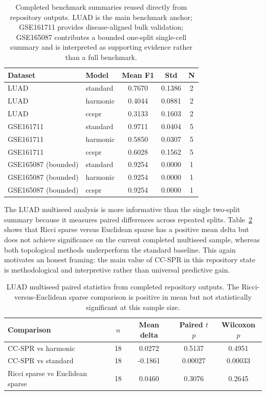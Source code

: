 \documentclass[11pt]{article}
\begin{document}
\begin{table}[h]
\centering
\small
\begin{tabular}{llccc}
\toprule
Dataset & Model & Mean F1 & Std & N \\
\midrule
LUAD & standard & 0.7670 & 0.1386 & 2 \\
LUAD & harmonic & 0.4044 & 0.0881 & 2 \\
LUAD & ccspr & 0.3133 & 0.1603 & 2 \\
\midrule
GSE161711 & standard & 0.9711 & 0.0404 & 5 \\
GSE161711 & harmonic & 0.5850 & 0.0307 & 5 \\
GSE161711 & ccspr & 0.6028 & 0.1562 & 5 \\
\midrule
GSE165087 (bounded) & standard & 0.9254 & 0.0000 & 1 \\
GSE165087 (bounded) & harmonic & 0.9254 & 0.0000 & 1 \\
GSE165087 (bounded) & ccspr & 0.9254 & 0.0000 & 1 \\
\bottomrule
\end{tabular}
\caption{Completed benchmark summaries reused directly from repository outputs. LUAD is the main benchmark anchor; GSE161711 provides disease-aligned bulk validation; GSE165087 contributes a bounded one-split single-cell summary and is interpreted as supporting evidence rather than a full benchmark.}
\label{tab:mainbench}
\end{table}

The LUAD multiseed analysis is more informative than the single two-split summary because it measures paired differences across repeated splits. Table~\ref{tab:paired} shows that Ricci sparse versus Euclidean sparse has a positive mean delta but does not achieve significance on the current completed multiseed sample, whereas both topological methods underperform the standard baseline. This again motivates an honest framing: the main value of CC-SPR in this repository state is methodological and interpretive rather than universal predictive gain.

\begin{table}[h]
\centering
\small
\begin{tabular}{lcccc}
\toprule
Comparison & $n$ & Mean delta & Paired $t$ $p$ & Wilcoxon $p$ \\
\midrule
CC-SPR vs harmonic & 18 & 0.0272 & 0.5137 & 0.4951 \\
CC-SPR vs standard & 18 & -0.1861 & 0.00027 & 0.00033 \\
Ricci sparse vs Euclidean sparse & 18 & 0.0460 & 0.3076 & 0.2645 \\
\bottomrule
\end{tabular}
\caption{LUAD multiseed paired statistics from completed repository outputs. The Ricci-versus-Euclidean sparse comparison is positive in mean but not statistically significant at this sample size.}
\label{tab:paired}
\end{table}
\end{document}
